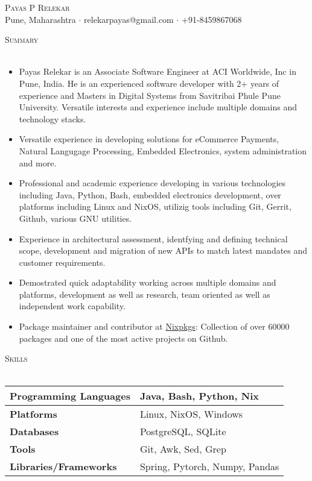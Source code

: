\documentclass[a4paper]{article}
\newcommand{\lineunder} {
    \vspace*{-8pt} \\
    \hspace*{-18pt} \hrulefill \\
}
\newcommand{\header} [1] {
    {\hspace*{-18pt}\vspace*{6pt} \textsc{#1}}
    \vspace*{-6pt} \lineunder
}
\begin{document}
\vspace*{-40pt}

\vspace*{-10pt}
\begin{center}
	{\Huge \scshape {Payas P Relekar}}\\
	Pune, Maharashtra $\cdot$ relekarpayas@gmail.com $\cdot$ +91-8459867068\\
\end{center}

\header{Summary}
\vspace{1mm}

\begin{itemize} \itemsep 1pt
  \item Payas Relekar is an Associate Software Engineer at ACI Worldwide, Inc in Pune, India. He is an experienced software developer with 2+ years of experience and Masters in Digital Systems from Savitribai Phule Pune University. Versatile interests and experience include multiple domains and technology stacks.
  \item Versatile experience in developing solutions for eCommerce Payments, Natural Langugage Processing, Embedded Electronics, system administration and more.
  \item Professional and academic experience developing in various technologies including Java, Python, Bash, embedded electronics development, over platforms including Linux and NixOS, utilizig tools including Git, Gerrit, Github, various GNU utilities.
  \item Experience in architectural assessment, identfying and defining technical scope, development and migration of new APIs to match latest mandates and customer requirements.
  \item Demostrated quick adaptability working across multiple domains and platforms, development as well as research, team oriented as well as independent work capability.
  \item Package maintainer and contributor at \href{https://github.com/NixOS/nixpkgs/}{Nixpkgs}: Collection of over 60000 packages and one of the most active projects on Github.
\end{itemize}

\header{Skills}
\vspace{1mm}
\bgroup
\def\arraystretch{1.5}
{\renewcommand{\arraystretch}{1.5}}
\begin{tabularx}{\textwidth}{ | X | X | }
  \hline
	\textbf{Programming Languages} & Java, Bash, Python, Nix        \\
  \hline
	\textbf{Platforms}             & Linux, NixOS, Windows          \\
  \hline
	\textbf{Databases}             & PostgreSQL, SQLite             \\
  \hline
	\textbf{Tools}                 & Git, Awk, Sed, Grep            \\
  \hline
	\textbf{Libraries/Frameworks}  & Spring, Pytorch, Numpy, Pandas \\
  \hline
\end{tabularx}
\egroup
\vspace{2mm}
\end{document}
